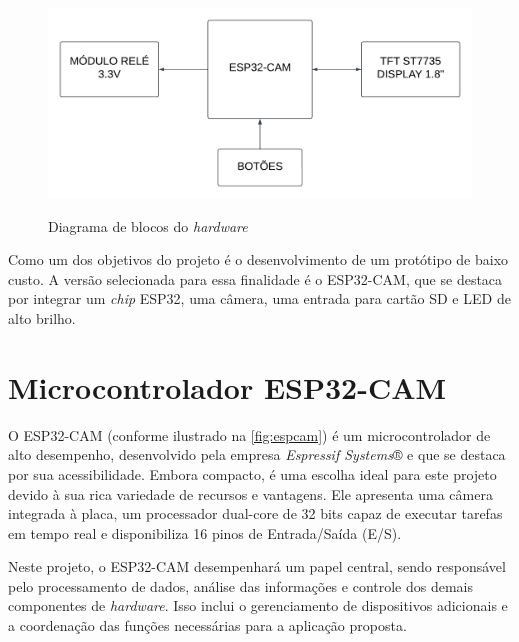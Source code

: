 \begin{figure}[h!]
    \centering
    \caption{Diagrama de blocos do \textit{hardware}}
    \includegraphics[scale=0.22]{figuras/diagrama_hardware.png}
    \fonte{}%
    \label{fig:fluxohard}
    \centering
\end{figure}

Como um dos objetivos do projeto é o desenvolvimento de um protótipo de
baixo custo. A versão selecionada para essa finalidade é o ESP32-CAM,
que se destaca por integrar um \textit{chip} ESP32, uma câmera, uma
entrada para cartão SD e LED de alto brilho.

\section{Microcontrolador ESP32-CAM}\label{sec:materiais}

O ESP32-CAM (conforme ilustrado na \autoref{fig:espcam}) é um
microcontrolador de alto desempenho, desenvolvido pela empresa
\textit{Espressif Systems}® e que se destaca por sua acessibilidade.
Embora compacto, é uma escolha ideal para este projeto devido à sua
rica variedade de recursos e vantagens. Ele apresenta uma câmera
integrada à placa, um processador dual-core de 32 bits capaz de
executar tarefas em tempo real e disponibiliza 16 pinos de
Entrada/Saída (E/S).

Neste projeto, o ESP32-CAM desempenhará um papel central, sendo
responsável pelo processamento de dados, análise das informações
e controle dos demais componentes de \textit{hardware}. Isso inclui
o gerenciamento de dispositivos adicionais e a coordenação das funções
necessárias para a aplicação proposta.


